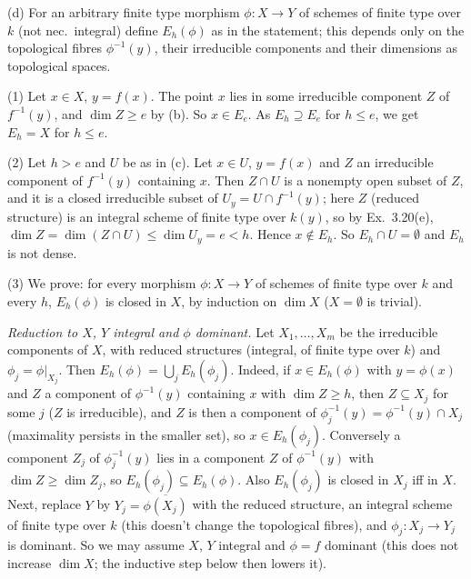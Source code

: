 \documentclass[11pt]{article}
\begin{document}
(d) For an arbitrary finite type morphism $\phi:X\to Y$ of schemes of finite type over $k$ (not nec.\ integral) define $E_h(\phi)$ as in the statement; this depends only on the topological fibres $\phi^{-1}(y)$, their irreducible components and their dimensions as topological spaces.

(1) Let $x\in X$, $y=f(x)$. The point $x$ lies in some irreducible component $Z$ of $f^{-1}(y)$, and $\dim Z\ge e$ by (b). So $x\in E_e$. As $E_h\supseteq E_e$ for $h\le e$, we get $E_h=X$ for $h\le e$.

(2) Let $h>e$ and $U$ be as in (c). Let $x\in U$, $y=f(x)$ and $Z$ an irreducible component of $f^{-1}(y)$ containing $x$. Then $Z\cap U$ is a nonempty open subset of $Z$, and it is a closed irreducible subset of $U_y=U\cap f^{-1}(y)$; here $Z$ (reduced structure) is an integral scheme of finite type over $k(y)$, so by Ex.~3.20(e), $\dim Z=\dim(Z\cap U)\le\dim U_y=e<h$. Hence $x\notin E_h$. So $E_h\cap U=\emptyset$ and $E_h$ is not dense.

(3) We prove: for every morphism $\phi:X\to Y$ of schemes of finite type over $k$ and every $h$, $E_h(\phi)$ is closed in $X$, by induction on $\dim X$ ($X=\emptyset$ is trivial).

\emph{Reduction to $X$, $Y$ integral and $\phi$ dominant.} Let $X_1,\dots,X_m$ be the irreducible components of $X$, with reduced structures (integral, of finite type over $k$) and $\phi_j=\phi|_{X_j}$. Then $E_h(\phi)=\bigcup_jE_h(\phi_j)$. Indeed, if $x\in E_h(\phi)$ with $y=\phi(x)$ and $Z$ a component of $\phi^{-1}(y)$ containing $x$ with $\dim Z\ge h$, then $Z\subseteq X_j$ for some $j$ ($Z$ is irreducible), and $Z$ is then a component of $\phi_j^{-1}(y)=\phi^{-1}(y)\cap X_j$ (maximality persists in the smaller set), so $x\in E_h(\phi_j)$. Conversely a component $Z_j$ of $\phi_j^{-1}(y)$ lies in a component $Z$ of $\phi^{-1}(y)$ with $\dim Z\ge\dim Z_j$, so $E_h(\phi_j)\subseteq E_h(\phi)$. Also $E_h(\phi_j)$ is closed in $X_j$ iff in $X$. Next, replace $Y$ by $Y_j=\overline{\phi(X_j)}$ with the reduced structure, an integral scheme of finite type over $k$ (this doesn't change the topological fibres), and $\phi_j:X_j\to Y_j$ is dominant. So we may assume $X$, $Y$ integral and $\phi=f$ dominant (this does not increase $\dim X$; the inductive step below then lowers it).
\end{document}
